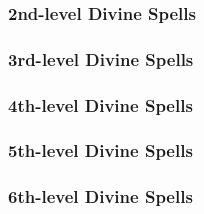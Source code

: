 \subsubsection{2nd-level Divine Spells}
\begin{spelllist}
    \SLaid
    \SLcuremoderatewounds
    \SLdelaypoison
    \SLdetectalignment
    \SLholdperson
    \SLinflictmoderatewounds
    \SLplanardisruption
    \SLprotectionfromalignment
    \SLsharepain
    \SLsilence
    \SLsummonmonsterii
    \SLtotemicmind
    \SLtotemicpower
\end{spelllist}

\subsubsection{3rd-level Divine Spells}
\begin{spelllist}
    \SLcureseriouswounds
    \SLcurseofbloodandbone
    \SLdeathward
    \SLdimensionalanchor
    \SLdispelmagic
    \SLfreedom
    \SLinflictseriouswounds
    \SLresistenergygreater
    \SLsearinglight
    \SLspiritualweapon
    \SLsummonmonsteriii
\end{spelllist}

\subsubsection{4th-level Divine Spells}
\begin{spelllist}
    \SLairwalk
    \SLbladebarrier
    \SLblessmass
    \SLcommandmass
    \SLcurecriticalwounds
    \SLdiscernlies
    \SLenervation
    \SLinflictcriticalwounds
    \SLpoison
    \SLsummonmonsteriv
    \SLtotemicmindmass
    \SLtotemicpowermass
\end{spelllist}

\subsubsection{5th-level Divine Spells}
\begin{spelllist}
    \SLbanemass
    \SLcurelightwoundsmass
    \SLdivinefavorgreater
    \SLflamestrike
    \SLinflictlightwoundsmass
    \SLplanardisruptionmass
    \SLrevivify
    \SLsummonmonsterv
    \SLsilencemass
    \SLtotemicmindgreater
    \SLtotemicpowergreater
\end{spelllist}

\subsubsection{6th-level Divine Spells}
\begin{spelllist}
    \SLblasphemy
    \SLcacaphonicword
    \SLcuremoderatewoundsmass
    \SLdictum
    \SLdispelmagicgreater
    \SLharm
    \SLheal
    \SLholdpersonmass
    \SLholyword
    \SLinflictmoderatewoundsmass
    \SLrighteousmight
    \SLsummonmonstervi
    \SLwordofrecall
\end{spelllist}

